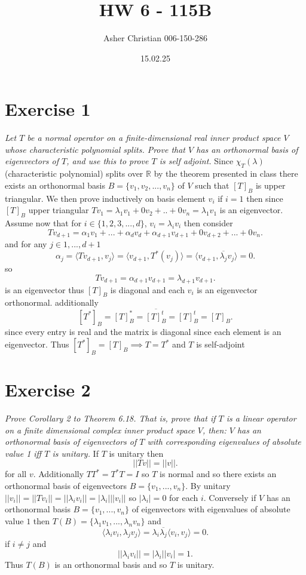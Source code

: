 \documentclass{article}
\title{HW 6 - 115B}
\author{Asher Christian 006-150-286}
\date{ 15.02.25}
\begin{document}
    \maketitle
    \section{Exercise 1}
    \emph{
        Let $T$ be a normal operator on a finite-dimensional real inner product space $V$ 
        whose characteristic polynomial splits. Prove that $V$ has an orthonormal basis
        of eigenvectors of $T$, and use this to prove $T$ is self adjoint.
    }
    Since $\chi_T(\lambda)$ (characteristic polynomial) splits over $ \mathbb{R}$ by the theorem presented
    in class there exists an orthonormal basis $B = \{v_1,v_2,...,v_n\}$ of $V$ such that
    $[T]_B$ is upper triangular. We then prove inductively on basis element $v_i$
    if $i=1$ then since $[T]_B$ upper triangular  $Tv_1 = \lambda_1 v_1 + 0v_2 + .. + 0v_n = \lambda_1 v_1$ is an eigenvector.
    Assume now that for $i \in\{1,2,3,...,d\}$,  $v_i = \lambda_i v_i$ then consider 
    \[
        Tv_{d+1} = \alpha_1 v_1 + ... + \alpha_{d}v_{d} + \alpha_{d+1}v_{d+1} + 0v_{d+2} + ... + 0 v_{n}
    .\] 
    and for any $j \in {1,...,d+1}$
    \[
        \alpha_j = \langle Tv_{d+1},v_j \rangle = \langle v_{d+1}, T^{*}(v_j) \rangle = \langle v_{d+1},\overline{\lambda_j}v_j \rangle = 0
    .\] 
    so
    \[
        Tv_{d+1} = \alpha_{d+1}v_{d+1} = \lambda_{d+1}v_{d+1}
    .\] 
    is an eigenvector thus $[T]_B$ is diagonal and each $v_i$ is an eigenvector orthonormal.
    additionally
    \[
        [T^{*}]_B = [T]_B^{*} = \overline{[T]_B^{t}} = [T]_B^{t} = [T]_B
    .\] 
    since every entry is real and the matrix is diagonal since each element is an eigenvector. Thus $[T^{*}]_B = [T]_B \implies T = T^{*}$ 
    and $T$ is self-adjoint

    \section{Exercise 2}
    \emph{
        Prove Corollary 2 to Theorem 6.18. That is, prove that if $T$ is a linear operator on a 
        finite dimensional complex inner product space $V$, then: $V$ has an orthonormal basis
        of eigenvectors of $T$ with corresponding eigenvalues of absolute value 1 iff $T$ 
        is unitary.
    }
    If $T$ is unitary then
    \[
    ||Tv|| = ||v||
    .\] for all $v$. Additionally $TT^{*} = T^{*}T = I$ so $T$ is normal and so there exists
    an orthonormal basis of eigenvectors $B = \{v_1,...,v_n\}$. By unitary $||v_i|| = ||Tv_i|| = ||\lambda_i v_i|| = |\lambda_i|||v_i||$ so
    $| \lambda_i| = 0$ for each $i$. Conversely if $V$ has an orthonormal basis $B = \{v_1,...,v_n\}$ of eigenvectors with eigenvalues of absolute value $1$ then
    $T(B) = \{\lambda_1v_1, ..., \lambda_nv_n\}$ and
    \[
    \langle \lambda_i v_i, \lambda_j v_j \rangle = \lambda_i \overline{\lambda_j} \langle v_i, v_j \rangle = 0
    .\] 
    if $i \ne j$ and
     \[
    ||\lambda_iv_i|| = |\lambda_i||v_i| = 1
    .\] 
    Thus $T(B)$ is an orthonormal basis and so $T$ is unitary.
\end{document}
